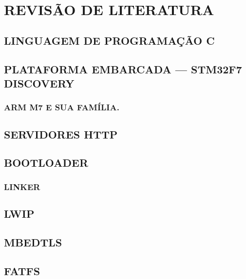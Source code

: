 
\chapter{REVISÃO DE LITERATURA}
\label{chap:fundamentacaoTeorica}

\section{LINGUAGEM DE PROGRAMAÇÃO C}
\section{PLATAFORMA EMBARCADA — STM32F7 DISCOVERY}
\subsection{ARM M7 E SUA FAMÍLIA.}
\section{SERVIDORES HTTP}
\section{BOOTLOADER}
\subsection{LINKER}
\section{LWIP}
\section{MBEDTLS}
\section{FATFS}

